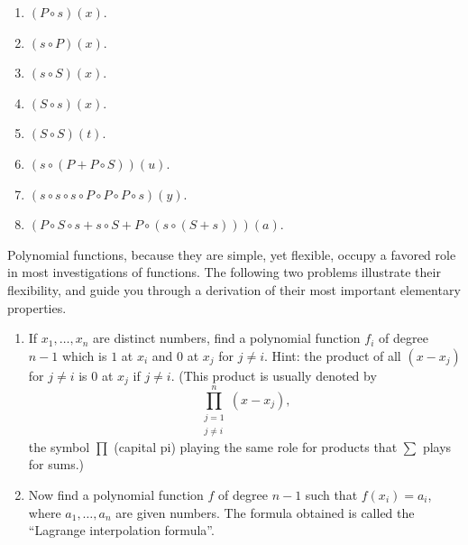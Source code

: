 \begin{solution}
  \begin{enumerate}[label = (\roman*)]
    \item $(P \circ s)(x)$.
    \item $(s \circ P)(x)$.
    \item $(s \circ S)(x)$.
    \item $(S \circ s)(x)$.
    \item $(S \circ S)(t)$.
    \item $(s \circ (P + P \circ S))(u)$.
    \item $(s \circ s \circ s \circ P \circ P \circ P \circ s)(y)$.
    \item $(P \circ S \circ s + s \circ S + P \circ (s \circ (S + s)))(a)$.
  \end{enumerate}
\end{solution}

\flushleft
Polynomial functions, because they are simple, yet flexible, occupy a favored
role in most investigations of functions. The following two problems illustrate
their flexibility, and guide you through a derivation of their most important
elementary properties.

\begin{pr} \label{3.6}
  \begin{enumerate}[label = (\alph*)]
    \item If $x_1,\ldots,x_n$ are distinct numbers, find a polynomial function $f_i$
    of degree $n - 1$ which is $1$ at $x_i$ and $0$ at $x_j$ for $j \neq i$. Hint:
    the product of all $(x - x_j)$ for $j \neq i$ is $0$ at $x_j$ if $j \neq i$.
    (This product is usually denoted by
    \begin{equation*}
      \prod_{\substack{j = 1 \\ j \neq i}}^{n} (x - x_j),
    \end{equation*}
    the symbol $\prod$ (capital pi) playing the same role for products that $\sum$
    plays for sums.)
    \item Now find a polynomial function $f$ of degree $n - 1$ such that $f(x_i) = a_i$,
    where $a_1,\ldots,a_n$ are given numbers. The formula obtained is called
    the ``Lagrange interpolation formula''.
  \end{enumerate}
\end{pr}

